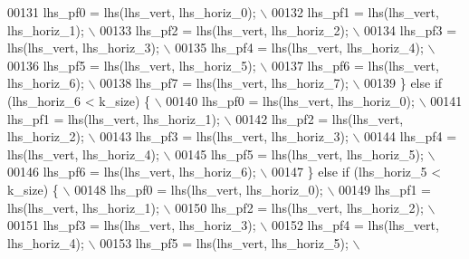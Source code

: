\begin{DoxyCode}
00131 \textcolor{preprocessor}{        lhs\_pf0 = lhs(lhs\_vert, lhs\_horiz\_0);                   \(\backslash\)}
00132 \textcolor{preprocessor}{        lhs\_pf1 = lhs(lhs\_vert, lhs\_horiz\_1);                   \(\backslash\)}
00133 \textcolor{preprocessor}{        lhs\_pf2 = lhs(lhs\_vert, lhs\_horiz\_2);                   \(\backslash\)}
00134 \textcolor{preprocessor}{        lhs\_pf3 = lhs(lhs\_vert, lhs\_horiz\_3);                   \(\backslash\)}
00135 \textcolor{preprocessor}{        lhs\_pf4 = lhs(lhs\_vert, lhs\_horiz\_4);                   \(\backslash\)}
00136 \textcolor{preprocessor}{        lhs\_pf5 = lhs(lhs\_vert, lhs\_horiz\_5);                   \(\backslash\)}
00137 \textcolor{preprocessor}{        lhs\_pf6 = lhs(lhs\_vert, lhs\_horiz\_6);                   \(\backslash\)}
00138 \textcolor{preprocessor}{        lhs\_pf7 = lhs(lhs\_vert, lhs\_horiz\_7);                   \(\backslash\)}
00139 \textcolor{preprocessor}{      \} else if (lhs\_horiz\_6 < k\_size) \{                        \(\backslash\)}
00140 \textcolor{preprocessor}{        lhs\_pf0 = lhs(lhs\_vert, lhs\_horiz\_0);                   \(\backslash\)}
00141 \textcolor{preprocessor}{        lhs\_pf1 = lhs(lhs\_vert, lhs\_horiz\_1);                   \(\backslash\)}
00142 \textcolor{preprocessor}{        lhs\_pf2 = lhs(lhs\_vert, lhs\_horiz\_2);                   \(\backslash\)}
00143 \textcolor{preprocessor}{        lhs\_pf3 = lhs(lhs\_vert, lhs\_horiz\_3);                   \(\backslash\)}
00144 \textcolor{preprocessor}{        lhs\_pf4 = lhs(lhs\_vert, lhs\_horiz\_4);                   \(\backslash\)}
00145 \textcolor{preprocessor}{        lhs\_pf5 = lhs(lhs\_vert, lhs\_horiz\_5);                   \(\backslash\)}
00146 \textcolor{preprocessor}{        lhs\_pf6 = lhs(lhs\_vert, lhs\_horiz\_6);                   \(\backslash\)}
00147 \textcolor{preprocessor}{      \} else if (lhs\_horiz\_5 < k\_size) \{                        \(\backslash\)}
00148 \textcolor{preprocessor}{        lhs\_pf0 = lhs(lhs\_vert, lhs\_horiz\_0);                   \(\backslash\)}
00149 \textcolor{preprocessor}{        lhs\_pf1 = lhs(lhs\_vert, lhs\_horiz\_1);                   \(\backslash\)}
00150 \textcolor{preprocessor}{        lhs\_pf2 = lhs(lhs\_vert, lhs\_horiz\_2);                   \(\backslash\)}
00151 \textcolor{preprocessor}{        lhs\_pf3 = lhs(lhs\_vert, lhs\_horiz\_3);                   \(\backslash\)}
00152 \textcolor{preprocessor}{        lhs\_pf4 = lhs(lhs\_vert, lhs\_horiz\_4);                   \(\backslash\)}
00153 \textcolor{preprocessor}{        lhs\_pf5 = lhs(lhs\_vert, lhs\_horiz\_5);                   \(\backslash\)}

\end{DoxyCode}
